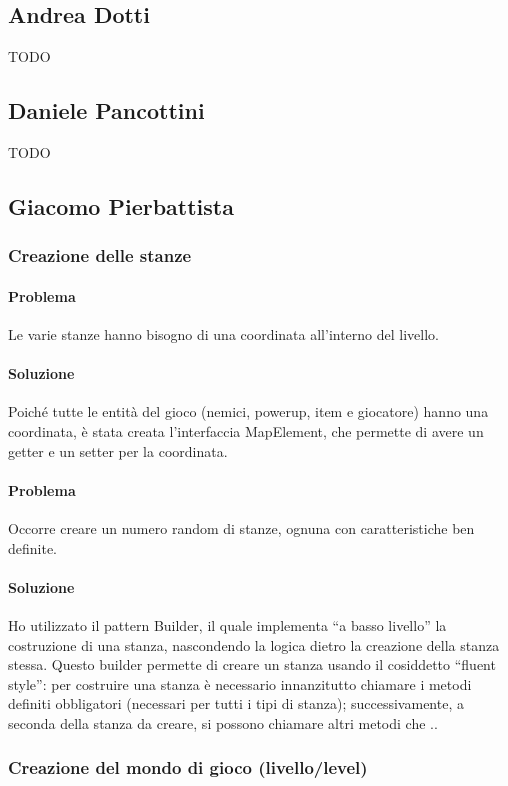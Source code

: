 \documentclass[a4paper,12pt]{report}
\begin{document}
\subsection*{Andrea Dotti}
{TODO}
\subsection*{Daniele Pancottini}
{TODO}


\subsection*{Giacomo Pierbattista}
\subsubsection{Creazione delle stanze}
\paragraph{Problema} Le varie stanze hanno bisogno di una coordinata all'interno del livello.
\paragraph{Soluzione} Poiché tutte le entità del gioco (nemici, powerup, item e giocatore) hanno una coordinata,
è stata creata l'interfaccia MapElement, che permette di avere un getter e un setter per la coordinata.


\paragraph{Problema} Occorre creare un numero random di stanze, ognuna con caratteristiche ben definite.
\paragraph{Soluzione} Ho utilizzato il pattern Builder, il quale implementa ``a basso livello'' la costruzione
di una stanza, nascondendo la logica dietro la creazione della stanza stessa. Questo builder permette di creare
un stanza usando il cosiddetto ``fluent style'': per costruire una stanza è necessario innanzitutto chiamare i metodi definiti
obbligatori (necessari per tutti i tipi di stanza); successivamente, a seconda della stanza da creare, si possono chiamare altri metodi
che ..

\subsubsection{Creazione del mondo di gioco (livello/level)}
\end{document}
